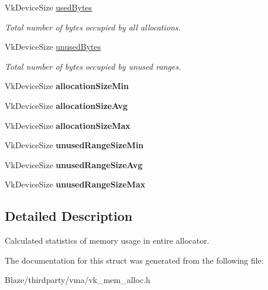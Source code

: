 \begin{DoxyCompactItemize}
Vk\+Device\+Size \hyperlink{structVmaStatInfo_ab0c6c73837e5a70c749fbd4f6064895a}{used\+Bytes}
\begin{DoxyCompactList}\small\item\em Total number of bytes occupied by all allocations. \end{DoxyCompactList}\item 
\mbox{\label{structVmaStatInfo_a1859d290aca2cd582d8dc25922092669}} 
Vk\+Device\+Size \hyperlink{structVmaStatInfo_a1859d290aca2cd582d8dc25922092669}{unused\+Bytes}
\begin{DoxyCompactList}\small\item\em Total number of bytes occupied by unused ranges. \end{DoxyCompactList}\item 
\mbox{\label{structVmaStatInfo_ade8b40bd3139c04aabd2fc538a356fea}} 
Vk\+Device\+Size {\bfseries allocation\+Size\+Min}
\item 
\mbox{\label{structVmaStatInfo_a1081a039964e566c672e7a2347f9e599}} 
Vk\+Device\+Size {\bfseries allocation\+Size\+Avg}
\item 
\mbox{\label{structVmaStatInfo_a17e9733a5ecd76287d4db6e66f71f50c}} 
Vk\+Device\+Size {\bfseries allocation\+Size\+Max}
\item 
\mbox{\label{structVmaStatInfo_aedeba931324f16589cd2416c0d2dd0d4}} 
Vk\+Device\+Size {\bfseries unused\+Range\+Size\+Min}
\item 
\mbox{\label{structVmaStatInfo_a2f9b3452af90c9768a30b7fb6ae194fc}} 
Vk\+Device\+Size {\bfseries unused\+Range\+Size\+Avg}
\item 
\mbox{\label{structVmaStatInfo_a5ba1a2476c4d39b10f7e2f7ebbb72ac4}} 
Vk\+Device\+Size {\bfseries unused\+Range\+Size\+Max}
\end{DoxyCompactItemize}


\subsection{Detailed Description}
Calculated statistics of memory usage in entire allocator. 

The documentation for this struct was generated from the following file\+:\begin{DoxyCompactItemize}
\item 
Blaze/thirdparty/vma/vk\+\_\+mem\+\_\+alloc.\+h\end{DoxyCompactItemize}
